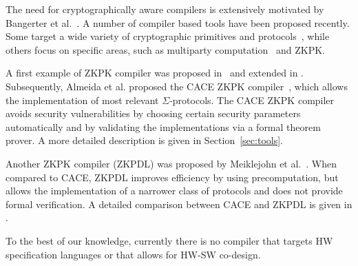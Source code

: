
The need for cryptographically aware compilers is extensively motivated by Bangerter et al.~\cite{citeulike:7079130}. A number of compiler based tools have been proposed recently. Some target a wide variety of cryptographic primitives and protocols~\cite{DBLP:conf/weworc/LucksST05,DBLP:conf/issa/BangerterKSU11}, while others focus on specific areas, such as multiparty computation~\cite{DBLP:conf/uss/MalkhiNPS04,DBLP:conf/pkc/DamgardGKN09,DBLP:conf/ccs/HeneckaKSSW10} and ZKPK.

A first example of ZKPK compiler was proposed in~\cite{TUD-CS-2005-0034} and extended in \cite{DBLP:conf/europki/BangerterBHKSS09}. Subsequently, Almeida et al. proposed the CACE ZKPK compiler~\cite{CACE}, which allows the implementation of most relevant $\Sigma$-protocols. The CACE ZKPK compiler avoids security vulnerabilities by choosing certain security parameters automatically and by validating the implementations via a formal theorem prover. A more detailed description is given in Section~\ref{sec:tools}.

Another ZKPK compiler (ZKPDL) was proposed by Meiklejohn et al.~\cite{Meiklejohn:2010:ZLS:1929820.1929838}. When compared to CACE, ZKPDL improves efficiency by using precomputation, but allows the implementation of a narrower class of protocols and does not provide formal verification. A detailed comparison between CACE and ZKPDL is given in \cite{Bangerter_yaczk:yet}.

To the best of our knowledge, currently there is no compiler that targets HW specification languages or that allows for HW-SW co-design.

 





